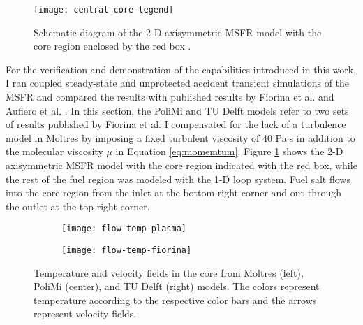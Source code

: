 \begin{figure}[htb!]
	\centering
	\texttt{[image: central-core-legend]}
	\caption{Schematic diagram of the 2-D axisymmetric \gls{MSFR} model with
	the core region enclosed by the red box \cite{park_advancement_2020}.}
	\label{fig:msfr-geometry}
\end{figure}

For the verification and demonstration of the capabilities introduced in this
work, I ran coupled steady-state and unprotected accident transient
simulations of the \gls{MSFR} and compared the results with published results
by Fiorina et al. \cite{fiorina_modelling_2014} and Aufiero et al.
\cite{aufiero_development_2014}. In this section, the PoliMi and TU Delft models
refer to two sets of results published by Fiorina et al. I compensated for
the lack of a turbulence model in Moltres by imposing a fixed turbulent
viscosity of 40 Pa$\cdot$s in addition to the molecular viscosity $\mu$ in
Equation \ref{eq:momemtum}. Figure \ref{fig:msfr-geometry} shows the 2-D
axisymmetric \gls{MSFR} model with the core region indicated with the red box,
while the rest of the fuel region was modeled with the 1-D loop system. Fuel
salt flows into the core region from the inlet at the bottom-right corner and
out through the outlet at the top-right corner.

\begin{figure}[htb!]
    \centering
    \begin{subfigure}[t]{.35\textwidth}
        \centering
        \texttt{[image: flow-temp-plasma]}
    \end{subfigure}
    \hfill
    \begin{subfigure}[t]{.625\textwidth}
        \centering
        \texttt{[image: flow-temp-fiorina]}
    \end{subfigure}
    \caption{Temperature and velocity fields in the core from Moltres
    (left), PoliMi (center), and TU Delft (right) models. The colors represent
    temperature according to the respective color bars and the arrows
    represent velocity fields. \cite{park_advancement_2020}}
    \label{fig:flow-temp}
\end{figure}

